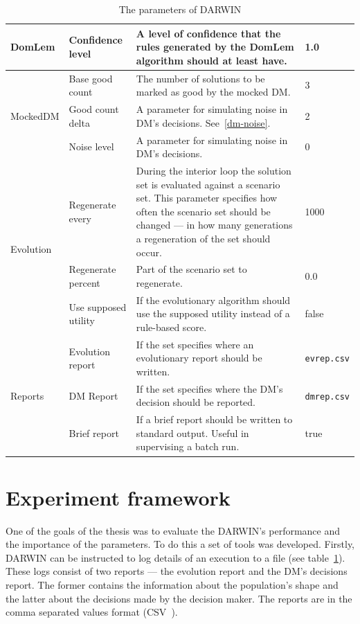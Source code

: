 \begin{table}
\begin{tabular}{l l p{7cm} l}
    \hline
    DomLem & Confidence level & A level of confidence that the rules generated by the
    DomLem algorithm should at least have. & 1.0 \\
    \hline
    \multirow{3}{*}{MockedDM} & Base good count & The number of solutions to be marked
    as good by the mocked DM. & 3 \\
    & Good count delta & A parameter for simulating noise in DM's decisions. See~\ref{dm-noise}. & 2 \\
    & Noise level & A parameter for simulating noise in DM's decisions. & 0 \\
    \hline
    \multirow{3}{*}{Evolution} & Regenerate every & During the interior loop
    the solution set is evaluated against a scenario set. This parameter
    specifies how often the scenario set should be changed --- in how many
    generations a regeneration of the set should occur. & 1000 \\
    & Regenerate percent & Part of the scenario set to regenerate. & 0.0 \\
    & Use supposed utility & If the evolutionary algorithm should use the
    supposed utility instead of a rule-based score. & false \\
    \hline
    \multirow{3}{*}{Reports} & Evolution report & If the set specifies where an
    evolutionary report should be written.  & \texttt{evrep.csv} \\
    & DM Report & If the set specifies where the DM's decision should be reported. & \texttt{dmrep.csv} \\
    &  Brief report & If a brief report should be written to standard
    output. Useful in supervising a batch run. & true \\
    \hline
  \end{tabular}
  \caption{The parameters of DARWIN}
  \label{t:params}
\end{table}


\section{Experiment framework}
One of the goals of the thesis was to evaluate the DARWIN's performance and
the importance of the parameters. To do this a set of tools was
developed. Firstly, DARWIN can be instructed to log details of an execution to
a file (see table~\ref{t:params}). These logs consist of two reports --- the
evolution report and the DM's decisions report. The former contains the
information about the population's shape and the latter about the decisions
made by the decision maker. The reports are in the comma separated values
format (CSV~\cite{RFC4180}).

